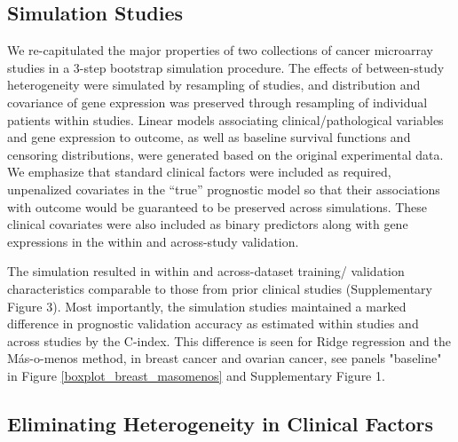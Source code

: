 \documentclass{bioinfo}
\begin{document}
  \subsection{Simulation Studies}

  We re-capitulated the major properties of %
  two collections of cancer microarray studies in a 3-step bootstrap
  simulation procedure. The effects of between-study heterogeneity
  were simulated by resampling of studies, and distribution and
  covariance of gene expression was preserved through resampling of
  individual patients within studies.  Linear models associating
  clinical/pathological variables and gene expression to outcome, as
  well as baseline survival functions and censoring distributions,
  were generated based on the original experimental data.  We
  emphasize that standard clinical factors were included as required,
  unpenalized covariates in the ``true'' prognostic model so that
  their associations with outcome would be guaranteed to be preserved
  across simulations. 
  These clinical covariates were also included as binary predictors along with
  gene expressions in the within and across-study validation.   

  The simulation resulted in within and across-dataset
  training/ validation characteristics comparable to those from prior
  clinical studies (Supplementary Figure 3).  Most importantly, the
  simulation studies maintained a marked difference in prognostic
  validation accuracy as estimated within studies and across studies
  by the C-index. This difference is seen for Ridge regression 
  and the M\'{a}s-o-menos method, in breast cancer and ovarian cancer, 
  see panels "baseline" in Figure \ref{boxplot_breast_masomenos} and Supplementary Figure 1.



  \subsection{Eliminating Heterogeneity in Clinical Factors}
\end{document}
